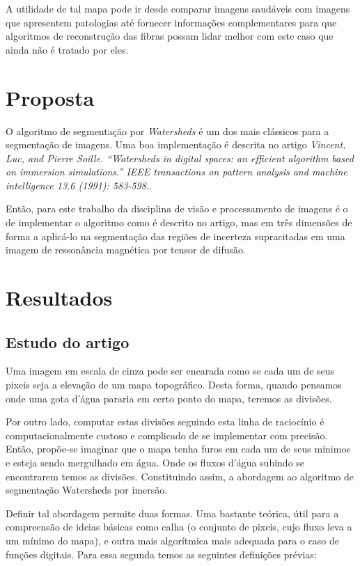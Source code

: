 \documentclass[a4paper,11pt]{report}
\begin{document}
A utilidade de tal mapa pode ir desde comparar imagens saudáveis com imagens que apresentem patologias até fornecer informações complementares para que algoritmos de reconstrução das fibras possam lidar melhor com este caso que ainda não é tratado por eles.

\chapter{Proposta}
O algoritmo de segmentação por \textit{Watersheds} é um dos mais clássicos para a segmentação de imagens. Uma boa implementação é descrita no artigo \textit{Vincent, Luc, and Pierre Soille. ``Watersheds in digital spaces: an efficient algorithm based on immersion simulations.'' IEEE transactions on pattern analysis and machine intelligence 13.6 (1991): 583-598.}.

Então, para este trabalho da disciplina de visão e processamento de imagens é o de implementar o algoritmo como é descrito no artigo, mas em três dimensões de forma a aplicá-lo na segmentação das regiões de incerteza supracitadas em uma imagem de ressonância magnética por tensor de difusão.

\chapter{Resultados}
  \section{Estudo do artigo}
  Uma imagem em escala de cinza pode ser encarada como se cada um de seus pixeis seja a elevação de um mapa topográfico. Desta forma, quando pensamos onde uma gota d'água pararia em certo ponto do mapa, teremos as divisões.

  Por outro lado, computar estas divisões seguindo esta linha de raciocínio é computacionalmente custoso e complicado de se implementar com precisão. Então, propõe-se imaginar que o mapa tenha furos em cada um de seus mínimos e esteja sendo mergulhado em água. Onde os fluxos d'água subindo se encontrarem temos as divisões. Constituindo assim, a abordagem ao algoritmo de segmentação Watersheds por imersão.

  Definir tal abordagem permite duas formas. Uma bastante teórica, útil para a compreensão de ideias básicas como calha (o conjunto de pixeis, cujo fluxo leva a um mínimo do mapa), e outra mais algorítmica mais adequada para o caso de funções digitais. Para essa segunda temos as seguintes definições prévias:
\end{document}
